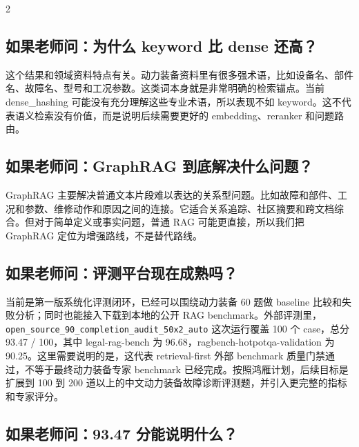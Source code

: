 \documentclass[10pt, a4paper]{ctexart}
\begin{document}
\begin{multicols}{2}
\subsection*{如果老师问：为什么 keyword 比 dense 还高？}


这个结果和领域资料特点有关。动力装备资料里有很多强术语，比如设备名、部件名、故障名、型号和工况参数。这类词本身就是非常明确的检索锚点。当前 dense\_hashing 可能没有充分理解这些专业术语，所以表现不如 keyword。这不代表语义检索没有价值，而是说明后续需要更好的 embedding、reranker 和问题路由。

\subsection*{如果老师问：GraphRAG 到底解决什么问题？}


GraphRAG 主要解决普通文本片段难以表达的关系型问题。比如故障和部件、工况和参数、维修动作和原因之间的连接。它适合关系追踪、社区摘要和跨文档综合。但对于简单定义或事实问题，普通 RAG 可能更直接，所以我们把 GraphRAG 定位为增强路线，不是替代路线。

\subsection*{如果老师问：评测平台现在成熟吗？}


当前是第一版系统化评测闭环，已经可以围绕动力装备 60 题做 baseline 比较和失败分析；同时也能接入下载到本地的公开 RAG benchmark。外部评测里，\texttt{open\_source\_90\_completion\_audit\_50x2\_auto} 这次运行覆盖 100 个 case，总分 93.47 / 100，其中 legal-rag-bench 为 96.68，ragbench-hotpotqa-validation 为 90.25。这里需要说明的是，这代表 retrieval-first 外部 benchmark 质量门禁通过，不等于最终动力装备专家 benchmark 已经完成。按照鸿雁计划，后续目标是扩展到 100 到 200 道以上的中文动力装备故障诊断评测题，并引入更完整的指标和专家评分。

\subsection*{如果老师问：93.47 分能说明什么？}



\end{multicols}
\end{document}
